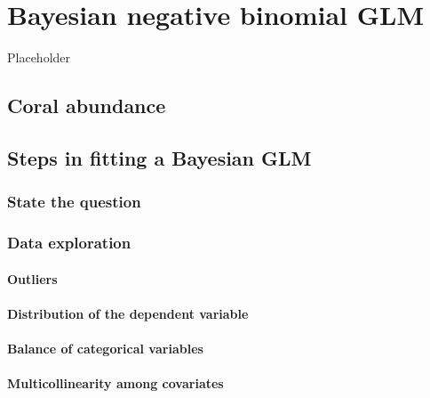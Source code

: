 \documentclass[
]{book}
\begin{document}
\hypertarget{nb-glm}{%
\chapter{Bayesian negative binomial GLM}\label{nb-glm}}

Placeholder

\hypertarget{coral-abundance}{%
\section{Coral abundance}\label{coral-abundance}}

\hypertarget{nb-glm-steps}{%
\section{Steps in fitting a Bayesian GLM}\label{nb-glm-steps}}

\hypertarget{coral-question}{%
\subsection{State the question}\label{coral-question}}

\hypertarget{coral-eda}{%
\subsection{Data exploration}\label{coral-eda}}

\hypertarget{coral-outliers}{%
\subsubsection{Outliers}\label{coral-outliers}}

\hypertarget{nb-dist}{%
\subsubsection{Distribution of the dependent variable}\label{nb-dist}}

\hypertarget{nb-balance}{%
\subsubsection{Balance of categorical variables}\label{nb-balance}}

\hypertarget{nb-collin}{%
\subsubsection{Multicollinearity among covariates}\label{nb-collin}}
\end{document}
